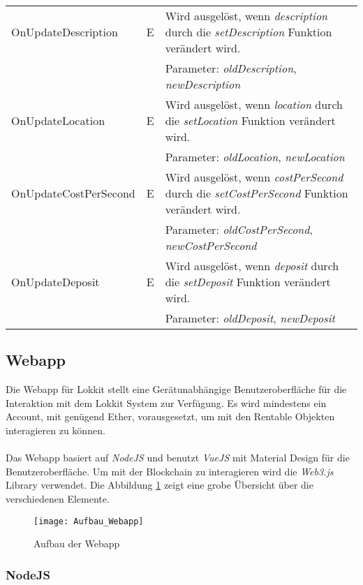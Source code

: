 \begin{longtable}{@{}lcL{9cm}@{}}
OnUpdateDescription              & E   & Wird ausgelöst, wenn \emph{description} durch die \emph{setDescription} Funktion verändert wird.\\ & & Parameter: \emph{oldDescription}, \emph{newDescription} \\ \midrule
OnUpdateLocation              & E   & Wird ausgelöst, wenn \emph{location} durch die \emph{setLocation} Funktion verändert wird.\\ & & Parameter: \emph{oldLocation}, \emph{newLocation} \\ \midrule
OnUpdateCostPerSecond              & E   & Wird ausgelöst, wenn \emph{costPerSecond} durch die \emph{setCostPerSecond} Funktion verändert wird.\\ & & Parameter: \emph{oldCostPerSecond}, \emph{newCostPerSecond} \\ \midrule
OnUpdateDeposit              & E   & Wird ausgelöst, wenn \emph{deposit} durch die \emph{setDeposit} Funktion verändert wird.\\ & & Parameter: \emph{oldDeposit}, \emph{newDeposit} \\
\bottomrule
\end{longtable}


\subsection{Webapp}
\label{sys_subsec:Webapp}
Die Webapp für Lokkit stellt eine Gerätunabhängige Benutzeroberfläche für die Interaktion mit dem Lokkit System zur Verfügung. Es wird mindestens ein Account, mit genügend Ether, vorausgesetzt, um mit den Rentable Objekten interagieren zu können.

\paragraph{}
Das Webapp basiert auf \emph{NodeJS} und benutzt \emph{VueJS} mit Material Design für die Benutzeroberfläche. Um mit der Blockchain zu interagieren wird die \emph{Web3.js} Library verwendet. Die Abbildung \ref{fig:Aufbau der Webapp} zeigt eine grobe Übersicht über die verschiedenen Elemente.



\begin{figure}[H]
\centering
\texttt{[image: Aufbau\_Webapp]}
\caption{Aufbau der Webapp}
\label{fig:Aufbau der Webapp}
\end{figure}

\subsubsection{NodeJS}
